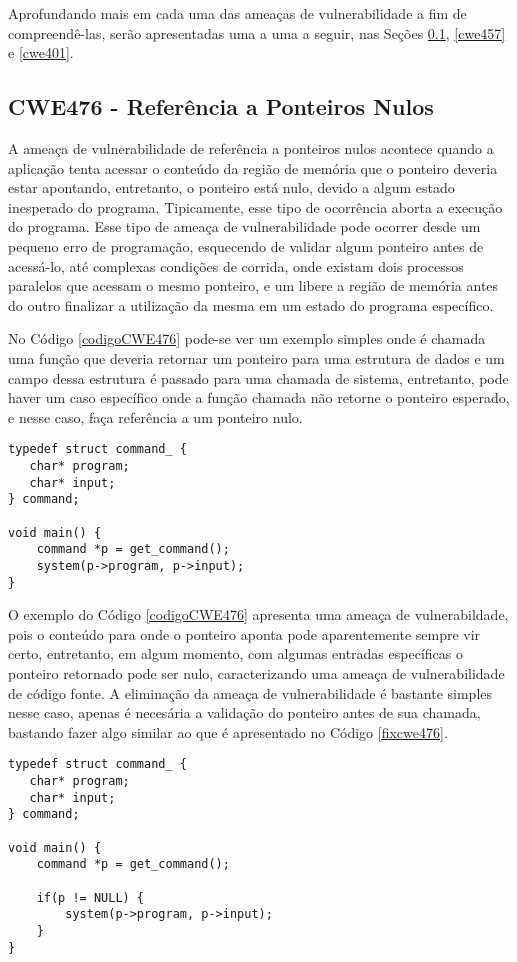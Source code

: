 Aprofundando mais em cada uma das ameaças de vulnerabilidade a fim de
compreendê-las, serão apresentadas uma a uma a seguir, nas Seções \ref{cwe476},
\ref{cwe457} e \ref{cwe401}.

\subsection{CWE476 - Referência a Ponteiros Nulos}\label{cwe476}

A ameaça de vulnerabilidade de referência a ponteiros nulos acontece quando
a aplicação tenta acessar o conteúdo da região de memória que o ponteiro deveria estar
apontando, entretanto, o ponteiro está nulo, devido a algum estado inesperado do
programa. Tipicamente, esse tipo de ocorrência aborta a execução do programa.
Esse tipo de ameaça de vulnerabilidade pode ocorrer desde um pequeno erro de
programação, esquecendo de validar algum ponteiro antes de acessá-lo, até
complexas condições de corrida, onde existam dois processos paralelos que acessam o mesmo
ponteiro, e um libere a região de memória antes do outro finalizar a utilização
da mesma em um estado do programa específico. 

No Código \ref{codigoCWE476} pode-se ver um exemplo simples onde é chamada uma
função que deveria retornar um ponteiro para uma estrutura de dados e um campo
dessa estrutura é passado para uma chamada de sistema, entretanto, pode haver um
caso específico onde a função chamada não retorne o ponteiro esperado, e nesse
caso, faça referência a um ponteiro nulo.

\begin{lstlisting}[caption={Código exemplo CWE476}, label=codigoCWE476]
typedef struct command_ {
   char* program;
   char* input;
} command;

void main() {
    command *p = get_command();
    system(p->program, p->input);
} 
\end{lstlisting}

O exemplo do Código \ref{codigoCWE476} apresenta uma ameaça de vulnerabildade, pois o
conteúdo para onde o ponteiro aponta pode aparentemente sempre vir certo,
entretanto, em algum momento, com algumas entradas específicas o ponteiro
retornado pode ser nulo, caracterizando uma ameaça de vulnerabilidade de código
fonte. A eliminação da ameaça de vulnerabilidade é bastante simples nesse caso,
apenas é necesária a validação do ponteiro antes de sua chamada, bastando fazer
algo similar ao que é apresentado no Código \ref{fixcwe476}.

\begin{lstlisting}[caption={Evitando ameaça de vulnerabilidade CWE476},
label=fixcwe476]
typedef struct command_ {
   char* program;
   char* input;
} command;

void main() {
    command *p = get_command();

    if(p != NULL) {
        system(p->program, p->input);
    }
} 
\end{lstlisting}

